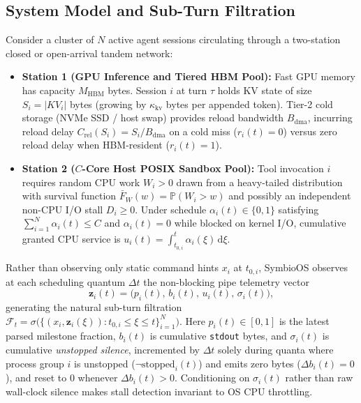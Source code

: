 \documentclass[10pt,journal,compsoc]{IEEEtran}
\theoremstyle{definition}
\theoremstyle{remark}
\newcommand{\SymbioOS}{\textup{\textsc{SymbioOS}}}
\newcommand{\Prob}{\mathbb{P}}
\def\SymbioOS{SymbioOS}%
\begin{document}
\subsection{System Model and Sub-Turn Filtration}
Consider a cluster of $N$ active agent sessions circulating through a two-station closed or open-arrival tandem network:
\begin{itemize}
\item \textbf{Station 1 (GPU Inference and Tiered HBM Pool):} Fast GPU memory has capacity $M_{\mathrm{HBM}}$ bytes. Session $i$ at turn $\tau$ holds KV state of size $S_i = |KV_i|$ bytes (growing by $\kappa_{\mathrm{kv}}$ bytes per appended token). Tier-2 cold storage (NVMe SSD / host swap) provides reload bandwidth $B_{\mathrm{dma}}$, incurring reload delay $C_{\mathrm{rel}}(S_i) = S_i / B_{\mathrm{dma}}$ on a cold miss ($r_i(t) = 0$) versus zero reload delay when HBM-resident ($r_i(t) = 1$).
\item \textbf{Station 2 ($C$-Core Host POSIX Sandbox Pool):} Tool invocation $i$ requires random CPU work $W_i > 0$ drawn from a heavy-tailed distribution with survival function $\bar{F}_W(w) = \Prob(W_i > w)$ and possibly an independent non-CPU I/O stall $D_i \ge 0$. Under schedule $\alpha_i(t) \in \{0, 1\}$ satisfying $\sum_{i=1}^N \alpha_i(t) \le C$ and $\alpha_i(t) = 0$ while blocked on kernel I/O, cumulative granted CPU service is $u_i(t) = \int_{t_{0,i}}^t \alpha_i(\xi)\,\mathrm{d}\xi$.
\end{itemize}

Rather than observing only static command hints $x_i$ at $t_{0,i}$, \SymbioOS{} observes at each scheduling quantum $\Delta t$ the non-blocking pipe telemetry vector
\begin{equation}\label{eq:telemetry}
\mathbf{z}_i(t) = \bigl(p_i(t),\, b_i(t),\, u_i(t),\, \sigma_i(t)\bigr),
\end{equation}
generating the natural sub-turn filtration $\mathcal{F}_t = \sigma\bigl(\{(x_i, \mathbf{z}_i(\xi)) : t_{0,i} \le \xi \le t\}_{i=1}^N\bigr)$. Here $p_i(t) \in [0, 1]$ is the latest parsed milestone fraction, $b_i(t)$ is cumulative \texttt{stdout} bytes, and $\sigma_i(t)$ is cumulative \emph{unstopped silence}, incremented by $\Delta t$ solely during quanta where process group $i$ is unstopped ($\neg\mathrm{stopped}_i(t)$) and emits zero bytes ($\Delta b_i(t) = 0$), and reset to $0$ whenever $\Delta b_i(t) > 0$. Conditioning on $\sigma_i(t)$ rather than raw wall-clock silence makes stall detection invariant to OS CPU throttling.
\end{document}
